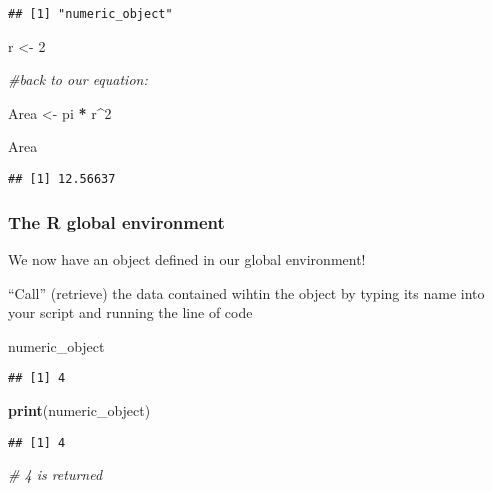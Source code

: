 \documentclass[]{article}
\newenvironment{Shaded}{\begin{snugshade}}{\end{snugshade}}
\newcommand{\KeywordTok}[1]{\textcolor[rgb]{0.13,0.29,0.53}{\textbf{#1}}}
\newcommand{\DecValTok}[1]{\textcolor[rgb]{0.00,0.00,0.81}{#1}}
\newcommand{\StringTok}[1]{\textcolor[rgb]{0.31,0.60,0.02}{#1}}
\newcommand{\CommentTok}[1]{\textcolor[rgb]{0.56,0.35,0.01}{\textit{#1}}}
\newcommand{\OperatorTok}[1]{\textcolor[rgb]{0.81,0.36,0.00}{\textbf{#1}}}
\newcommand{\NormalTok}[1]{#1}
\begin{document}
\begin{verbatim}
## [1] "numeric_object"
\end{verbatim}

\begin{Shaded}
\begin{Highlighting}[]
\NormalTok{r <-}\StringTok{ }\DecValTok{2}

\CommentTok{#back to our equation:}

\NormalTok{Area <-}\StringTok{ }\NormalTok{pi }\OperatorTok{*}\StringTok{ }\NormalTok{r}\OperatorTok{^}\DecValTok{2}

\NormalTok{Area}
\end{Highlighting}
\end{Shaded}

\begin{verbatim}
## [1] 12.56637
\end{verbatim}

\subsubsection{The R global environment}\label{the-r-global-environment}

We now have an object defined in our global environment!

``Call'' (retrieve) the data contained wihtin the object by typing its
name into your script and running the line of code

\begin{Shaded}
\begin{Highlighting}[]
\NormalTok{numeric_object }
\end{Highlighting}
\end{Shaded}

\begin{verbatim}
## [1] 4
\end{verbatim}

\begin{Shaded}
\begin{Highlighting}[]
\KeywordTok{print}\NormalTok{(numeric_object)}
\end{Highlighting}
\end{Shaded}

\begin{verbatim}
## [1] 4
\end{verbatim}

\begin{Shaded}
\begin{Highlighting}[]
\CommentTok{# 4 is returned}
\end{Highlighting}
\end{Shaded}
\end{document}
